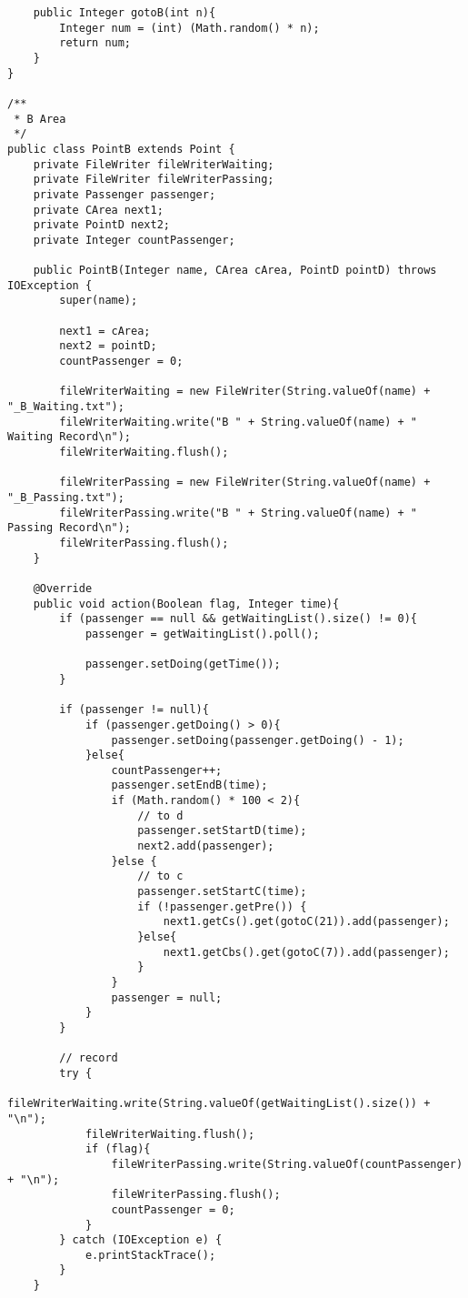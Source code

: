 \begin{lstlisting}
    public Integer gotoB(int n){
        Integer num = (int) (Math.random() * n);
        return num;
    }
}

/**
 * B Area
 */
public class PointB extends Point {
    private FileWriter fileWriterWaiting;
    private FileWriter fileWriterPassing;
    private Passenger passenger;
    private CArea next1;
    private PointD next2;
    private Integer countPassenger;

    public PointB(Integer name, CArea cArea, PointD pointD) throws IOException {
        super(name);

        next1 = cArea;
        next2 = pointD;
        countPassenger = 0;

        fileWriterWaiting = new FileWriter(String.valueOf(name) + "_B_Waiting.txt");
        fileWriterWaiting.write("B " + String.valueOf(name) + " Waiting Record\n");
        fileWriterWaiting.flush();

        fileWriterPassing = new FileWriter(String.valueOf(name) + "_B_Passing.txt");
        fileWriterPassing.write("B " + String.valueOf(name) + " Passing Record\n");
        fileWriterPassing.flush();
    }

    @Override
    public void action(Boolean flag, Integer time){
        if (passenger == null && getWaitingList().size() != 0){
            passenger = getWaitingList().poll();

            passenger.setDoing(getTime());
        }

        if (passenger != null){
            if (passenger.getDoing() > 0){
                passenger.setDoing(passenger.getDoing() - 1);
            }else{
                countPassenger++;
                passenger.setEndB(time);
                if (Math.random() * 100 < 2){
                    // to d
                    passenger.setStartD(time);
                    next2.add(passenger);
                }else {
                    // to c
                    passenger.setStartC(time);
                    if (!passenger.getPre()) {
                        next1.getCs().get(gotoC(21)).add(passenger);
                    }else{
                        next1.getCbs().get(gotoC(7)).add(passenger);
                    }
                }
                passenger = null;
            }
        }

        // record
        try {
            fileWriterWaiting.write(String.valueOf(getWaitingList().size()) + "\n");
            fileWriterWaiting.flush();
            if (flag){
                fileWriterPassing.write(String.valueOf(countPassenger) + "\n");
                fileWriterPassing.flush();
                countPassenger = 0;
            }
        } catch (IOException e) {
            e.printStackTrace();
        }
    }


\end{lstlisting}

